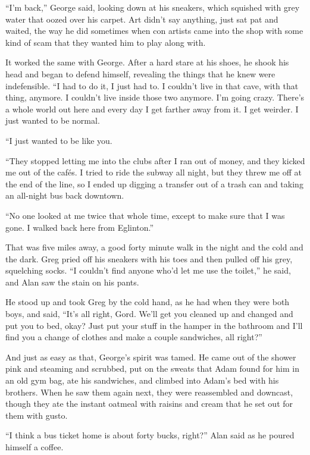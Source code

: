 \documentclass{article}
\begin{document}
``I'm back,'' George said, looking down at his sneakers, which
squished with grey water that oozed over his carpet.  Art didn't say
anything, just sat pat and waited, the way he did sometimes when con
artists came into the shop with some kind of scam that they wanted him
to play along with.

It worked the same with George.  After a hard stare at his shoes, he
shook his head and began to defend himself, revealing the things that
he knew were indefensible.  ``I had to do it, I just had to.  I
couldn't live in that cave, with that thing, anymore.  I couldn't live
inside those two anymore.  I'm going crazy.  There's a whole world out
here and every day I get farther away from it.  I get weirder.  I just
wanted to be normal.

``I just wanted to be like you.

``They stopped letting me into the clubs after I ran out of money, and
they kicked me out of the caf\'{e}s.  I tried to ride the subway all
night, but they threw me off at the end of the line, so I ended up
digging a transfer out of a trash can and taking an all-night bus back
downtown.

``No one looked at me twice that whole time, except to make sure that
I was gone.  I walked back here from Eglinton.''

That was five miles away, a good forty minute walk in the night and
the cold and the dark.  Greg pried off his sneakers with his toes and
then pulled off his grey, squelching socks.  ``I couldn't find anyone
who'd let me use the toilet,'' he said, and Alan saw the stain on his
pants.

He stood up and took Greg by the cold hand, as he had when they were
both boys, and said, ``It's all right, Gord.  We'll get you cleaned up
and changed and put you to bed, okay?  Just put your stuff in the
hamper in the bathroom and I'll find you a change of clothes and make
a couple sandwiches, all right?''

And just as easy as that, George's spirit was tamed.  He came out of
the shower pink and steaming and scrubbed, put on the sweats that Adam
found for him in an old gym bag, ate his sandwiches, and climbed into
Adam's bed with his brothers.  When he saw them again next, they were
reassembled and downcast, though they ate the instant oatmeal with
raisins and cream that he set out for them with gusto.

``I think a bus ticket home is about forty bucks, right?'' Alan said
as he poured himself a coffee.
\end{document}
